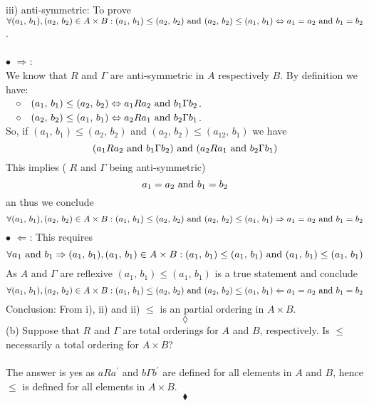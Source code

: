 iii) anti-symmetric: To prove $\forall (a_1,\, b_1), (a_2,\, b_2)\in A\times B: (a_1,\, b_1)\leq (a_2,\, b_2)\text{ and } (a_2,\, b_2)\leq (a_1,\, b_1)\Leftrightarrow a_1=a_2 \text{ and } b_1=b_2$.\\\\
$\bullet$ $ \Rightarrow$:\\
We know that $R$ and $\Gamma$ are anti-symmetric in $A$ respectively $B$. By definition we have:\\
$\quad \circ\quad  (a_1,\, b_1) \leq (a_2,\, b_2) \Leftrightarrow a_1Ra_2\text{ and } b_1\Gamma b_2$.\\
$\quad \circ\quad  (a_2,\, b_2) \leq (a_1,\, b_1) \Leftrightarrow a_2Ra_1\text{ and } b_2\Gamma b_1$.\\
So, if $(a_1,\, b_1) \leq (a_2,\, b_2) $ and $(a_2,\, b_2) \leq (a_12,\, b_1)$  we have
$$ (a_1Ra_2\text{ and } b_1\Gamma b_2)\text{ and } (a_2Ra_1\text{ and } b_2\Gamma b_1)$$
This implies ( $R$ and $\Gamma$ being anti-symmetric) 
$$ a_1=a_2 \text{ and } b_1=b_2$$
an thus we conclude 
$$\forall (a_1,\, b_1), (a_2,\, b_2)\in A\times B: (a_1,\, b_1)\leq (a_2,\, b_2)\text{ and } (a_2,\, b_2)\leq (a_1,\, b_1)\Rightarrow a_1=a_2 \text{ and } b_1=b_2$$
$\bullet$ $ \Leftarrow$:
This requires 
$$\forall a_1 \text{ and } b_1 \Rightarrow (a_1,\, b_1), (a_1,\, b_1)\in A\times B: (a_1,\, b_1)\leq (a_1,\, b_1)\text{ and } (a_1,\, b_1)\leq (a_1,\, b_1) $$
As $A$ and $\Gamma$ are reflexive $(a_1,\, b_1)\leq (a_1,\, b_1)$ is a true statement and conclude 
$$\forall (a_1,\, b_1), (a_2,\, b_2)\in A\times B: (a_1,\, b_1)\leq (a_2,\, b_2)\text{ and } (a_2,\, b_2)\leq (a_1,\, b_1)\Leftarrow a_1=a_2 \text{ and } b_1=b_2$$
Conclusion: From i), ii) and ii) $\leq$ is an partial ordering in $A\times B$.\\
$$\lozenge$$
(b) Suppose that $R$ and $\Gamma$ are total orderings for $A$ and $B$, respectively. Is $\leq$ necessarily a total ordering for $A \times B$?\\\\
The answer is yes as $aRa^{'}$ and $b\Gamma b^{'}$ are defined for all elements in $A$ and $B$, hence $\leq$ is defined for all elements in $A\times B$.
$$\blacklozenge$$

